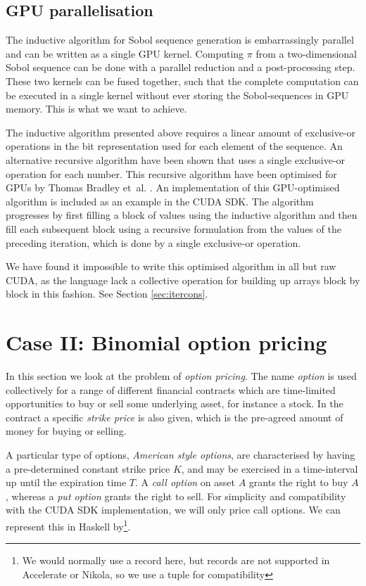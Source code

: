 \documentclass[preprint]{sigplanconf}
\begin{document}

\subsection{GPU parallelisation}
\label{sec:gpusobol}
The inductive algorithm for Sobol sequence generation is
embarrassingly parallel and can be written as a single GPU
kernel. Computing $\pi$ from a two-dimensional Sobol sequence can be
done with a parallel reduction and a post-processing step. These two
kernels can be fused together, such that the complete computation can
be executed in a single kernel without ever storing the
Sobol-sequences in GPU memory. This is what we want to achieve.

The inductive algorithm presented above requires a linear amount of
exclusive-or operations in the bit representation used for each
element of the sequence. An alternative recursive algorithm have been
shown that uses a single exclusive-or operation for each number. This
recursive algorithm have been optimised for GPUs by Thomas Bradley
et~al\@. \cite[Chapter~16]{hwy2011emerald}. An implementation of this
GPU-optimised algorithm is included as an example in the CUDA SDK. The
algorithm progresses by first filling a block of values using the
inductive algorithm and then fill each subsequent block using a
recursive formulation from the values of the preceding iteration,
which is done by a single exclusive-or operation.

We have found it impossible to write this optimised algorithm in all
but raw CUDA, as the language lack a collective operation for building
up arrays block by block in this fashion. See Section
\ref{sec:itercons}.

\section{Case II: Binomial option pricing}
In this section we look at the problem of \emph{option pricing}. The
name \emph{option} is used collectively for a range of different
financial contracts which are time-limited opportunities to buy or
sell some underlying asset, for instance a stock. In the contract a
specific \emph{strike price} is also given, which is the pre-agreed
amount of money for buying or selling.

A particular type of options, \emph{American style options}, are
characterised by having a pre-determined constant strike price $K$,
and may be exercised in a time-interval up until the expiration time
$T$. A \emph{call option} on asset $A$ grants the right to buy $A$,
whereas a \emph{put option} grants the right to sell. For simplicity
and compatibility with the CUDA SDK implementation, we will only price
call options. We can represent this in Haskell by\footnote{We would
  normally use a record here, but records are not supported in
  Accelerate or Nikola, so we use a tuple for compatibility}.
\end{document}

